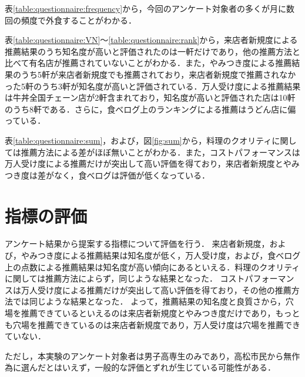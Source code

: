 	表\ref{table:questionnaire:frequency}から，今回のアンケート対象者の多くが月に数回の頻度で外食することがわかる．\par
	表\ref{table:questionnaire:VN}〜\ref{table:questionnaire:rank}から，来店者新規度による推薦結果のうち知名度が高いと評価されたのは一軒だけであり，他の推薦方法と比べて有名店が推薦されていないことがわかる．また，やみつき度による推薦結果のうち5軒が来店者新規度でも推薦されており，来店者新規度で推薦されなかった5軒のうち3軒が知名度が高いと評価されている．万人受け度による推薦結果は牛丼全国チェーン店が2軒含まれており，知名度が高いと評価された店は10軒のうち8軒である．さらに，食べログ上のランキングによる推薦はうどん店に偏っている．\par
	表\ref{table:questionnaire:sum}，および，図\ref{fig:sum}から，料理のクオリティに関しては推薦方法による差がほぼ無いことがわかる．また，コストパフォーマンスは万人受け度による推薦だけが突出して高い評価を得ており，来店者新規度とやみつき度は差がなく，食べログは評価が低くなっている．

\section{指標の評価}
アンケート結果から提案する指標について評価を行う．
来店者新規度，および，やみつき度による推薦結果は知名度が低く，万人受け度，および，食べログ上の点数による推薦結果は知名度が高い傾向にあるといえる．料理のクオリティに関しては推薦方法によらず，同じような結果となった．
コストパフォーマンスは万人受け度による推薦だけが突出して高い評価を得ており，その他の推薦方法では同じような結果となった．%
よって，推薦結果の知名度と良質さから，穴場を推薦できているといえるのは来店者新規度とやみつき度だけであり，もっとも穴場を推薦できているのは来店者新規度であり，万人受け度は穴場を推薦できていない．
\par
ただし，本実験のアンケート対象者は男子高専生のみであり，高松市民から無作為に選んだとはいえず，一般的な評価とずれが生じている可能性がある．
